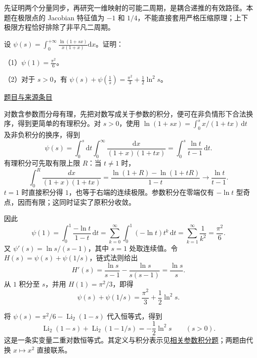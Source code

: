 \documentclass[12pt,fontset=fandol]{ctexart}
\begin{document}
\begin{remark}[方法与条件]先证明两个分量同步，再研究一维映射的可能二周期，是耦合递推的有效路径。本题在极限点的 Jacobian 特征值为 $-1$ 和 $1/4$，不能直接套用严格压缩原理；上下极限方程恰好排除了非平凡二周期。\end{remark}

\begin{example}[来源序号6]\label{ex:ch05-14th-A-makeup:6}\label{pr:ch05-14th-A-makeup:6}

设 $\psi(s) = \int_0^{+\infty} \frac{\ln(1+sx)}{x(1+x)} \mathrm{d}x$。证明：

（1）$\psi(1) = \frac{\pi^2}{6}$。

（2）对于 $s > 0$，有 $\psi(s) + \psi\left(\frac{1}{s}\right) = \frac{\pi^2}{3} + \frac{1}{2} \ln^2 s$。

\par\href{https://github.com/lzxcr/cmc-mathematics/blob/64916fa1fdbc3e444a652eca204d5669058ee321/src/problems/preliminary/14-makeup/06.md}{题目与来源条目}

\end{example}

\begin{solve}\label{ans:ch05-14th-A-makeup:6}

对数含参数而分母有理，先把对数写成关于参数的积分，便可在非负情形下合法换序，得到更简单的有理积分。对 $s>0$，使用 $\ln(1+sx)=\int_0^s x/(1+tx)\,\mathrm dt$ 及非负积分的换序，得到
\[
\psi(s)=\int_0^s\!\mathrm dt\int_0^\infty
\frac{\mathrm dx}{(1+x)(1+tx)}
=\int_0^s\frac{\ln t}{t-1}\,\mathrm dt.
\]
有理积分可先取有限上限 $R$：当 $t\ne1$ 时，
\[
\int_0^R\frac{dx}{(1+x)(1+tx)}
=\frac{\ln(1+R)-\ln(1+tR)}{1-t}
\longrightarrow\frac{\ln t}{t-1}.
\]
$t=1$ 时直接积分得 $1$，也等于右端的连续极限。参数积分在零端仅有 $-\ln t$ 型奇点，因而有限；这同时证实了原积分收敛。

因此
\[
\psi(1)=\int_0^1\frac{-\ln t}{1-t}\,\mathrm dt
=\sum_{k=0}^\infty\int_0^1(-\ln t)t^k\,\mathrm dt
=\sum_{k=1}^\infty\frac1{k^2}=\frac{\pi^2}{6}.
\]
又 $\psi'(s)=\ln s/(s-1)$，其中 $s=1$ 处取连续值。令 $H(s)=\psi(s)+\psi(1/s)$，链式法则给出
\[
H'(s)=\frac{\ln s}{s-1}-\frac{\ln s}{s(s-1)}
=\frac{\ln s}{s}.
\]
从 $1$ 积分至 $s$，并用 $H(1)=\pi^2/3$，即得
\[
\psi(s)+\psi(1/s)=\frac{\pi^2}{3}+\frac12\ln^2s.
\]

\end{solve}

\begin{remark}[方法与条件]将 $\psi(s)=\pi^2/6-\operatorname{Li}_2(1-s)$ 代入恒等式，得到
\[
\operatorname{Li}_2(1-s)+\operatorname{Li}_2(1-1/s)
=-\frac12\ln^2s\qquad(s>0).
\]
这是一条实变量二重对数恒等式。其定义与积分表示见\hyperref[pr:ch02-16th-A:2]{相关参数积分题}；两题由代换 $x\mapsto x^2$ 直接联系。\end{remark}
\end{document}
